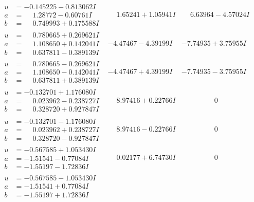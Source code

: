 \documentclass[1p]{elsarticle_modified}
\theoremstyle{definition}
\begin{document}
$$\begin{array}{c|c|c}
\begin{aligned}
u &= -0.145225 - 0.813062 I \\
a &= \phantom{-}1.28772 - 0.60761 I \\
b &= \phantom{-}0.749993 + 0.175588 I\end{aligned}
 & \phantom{-}1.65241 + 1.05941 I & \phantom{-}6.63964 - 4.57024 I \\ \hline\begin{aligned}
u &= \phantom{-}0.780665 + 0.269621 I \\
a &= \phantom{-}1.108650 + 0.142041 I \\
b &= \phantom{-}0.637811 - 0.389139 I\end{aligned}
 & -4.47467 - 4.39199 I & -7.74935 + 3.75955 I \\ \hline\begin{aligned}
u &= \phantom{-}0.780665 - 0.269621 I \\
a &= \phantom{-}1.108650 - 0.142041 I \\
b &= \phantom{-}0.637811 + 0.389139 I\end{aligned}
 & -4.47467 + 4.39199 I & -7.74935 - 3.75955 I \\ \hline\begin{aligned}
u &= -0.132701 + 1.176080 I \\
a &= \phantom{-}0.023962 - 0.238727 I \\
b &= \phantom{-}0.328720 + 0.927847 I\end{aligned}
 & \phantom{-}8.97416 + 0.22766 I & \phantom{-0.000000 } 0 \\ \hline\begin{aligned}
u &= -0.132701 - 1.176080 I \\
a &= \phantom{-}0.023962 + 0.238727 I \\
b &= \phantom{-}0.328720 - 0.927847 I\end{aligned}
 & \phantom{-}8.97416 - 0.22766 I & \phantom{-0.000000 } 0 \\ \hline\begin{aligned}
u &= -0.567585 + 1.053430 I \\
a &= -1.51541 - 0.77084 I \\
b &= -1.55197 - 1.72836 I\end{aligned}
 & \phantom{-}0.02177 + 6.74730 I & \phantom{-0.000000 } 0 \\ \hline\begin{aligned}
u &= -0.567585 - 1.053430 I \\
a &= -1.51541 + 0.77084 I \\
b &= -1.55197 + 1.72836 I\end{aligned}

\end{array}$$
\end{document}
